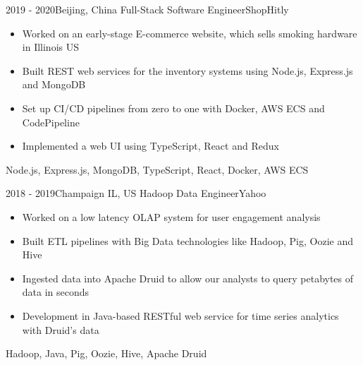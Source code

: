 \begin{experiences}
\experience
{2019 - 2020}{Beijing, China}
{Full-Stack Software Engineer}{ShopHitly}
{
    \begin{itemize}
    \item Worked on an early-stage E-commerce website, which sells smoking hardware in Illinois US
    \item Built REST web services for the inventory systems using Node.js, Express.js and MongoDB
    \item Set up CI/CD pipelines from zero to one with Docker, AWS ECS and CodePipeline
    \item Implemented a web UI using TypeScript, React and Redux
    \end{itemize}
}
{Node.js, Express.js, MongoDB, TypeScript, React, Docker, AWS ECS}

\emptySeparator

\experience
{2018 - 2019}{Champaign IL, US}
{Hadoop Data Engineer}{Yahoo}
{
    \begin{itemize}
    \item Worked on a low latency OLAP system for user engagement analysis
    \item Built ETL pipelines with Big Data technologies like Hadoop, Pig, Oozie and Hive
    \item Ingested data into Apache Druid to allow our analysts to query petabytes of data in seconds
    \item Development in Java-based RESTful web service for time series analytics with Druid's data
    \end{itemize}
}
{Hadoop, Java, Pig, Oozie, Hive, Apache Druid}

\end{experiences}